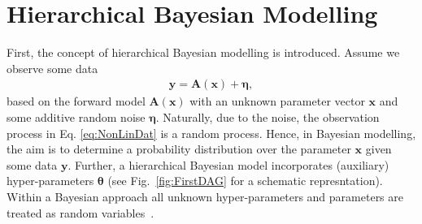 \documentclass{article}
\begin{document}
\section{Hierarchical Bayesian Modelling}
\label{sec:BayesIntro}
First, the concept of hierarchical Bayesian modelling is introduced.
Assume we observe some data
\begin{align}
	\bm{y} = \bm{A}( \bm{x}) + \bm{\eta},
	\label{eq:NonLinDat}
\end{align}
based on the forward model $\bm{A}(\bm{x})$ with an unknown parameter vector $\bm{x}$ and some additive random noise $\bm{\eta}$.
Naturally, due to the noise, the observation process in Eq. \ref{eq:NonLinDat} is a random process.
Hence, in Bayesian modelling, the aim is to determine a probability distribution over the parameter $\bm{x}$ given some data $\bm{y}$.
Further, a hierarchical Bayesian model incorporates (auxiliary) hyper-parameters $\bm{\theta}$ (see Fig.~\ref{fig:FirstDAG} for a schematic represntation).
Within a Bayesian approach all unknown hyper-parameters and parameters are treated as random variables~\cite[Chapter 3]{kaipio2005statinv}.
\end{document}

